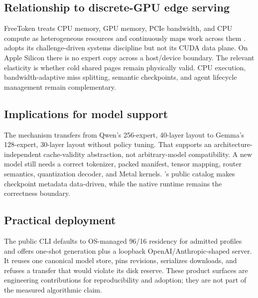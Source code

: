 \subsection{Relationship to discrete-GPU edge serving}

FreeToken treats CPU memory, GPU memory, PCIe bandwidth, and CPU compute as
heterogeneous resources and continuously maps work across them
\cite{yang2026freetoken}. \system adopts its challenge-driven systems
discipline but not its CUDA data plane. On Apple Silicon there is no expert copy
across a host/device boundary. The relevant elasticity is whether cold shared
pages remain physically valid. CPU execution, bandwidth-adaptive miss splitting,
semantic checkpoints, and agent lifecycle management remain complementary.

\subsection{Implications for model support}

The mechanism transfers from Qwen's 256-expert, 40-layer layout to Gemma's
128-expert, 30-layer layout without policy tuning. That supports an
architecture-independent cache-validity abstraction, not arbitrary-model
compatibility. A new model still needs a correct tokenizer, packed manifest,
tensor mapping, router semantics, quantization decoder, and Metal kernels.
\system's public catalog makes checkpoint metadata data-driven, while the
native runtime remains the correctness boundary.

\subsection{Practical deployment}

The public CLI defaults to OS-managed 96/16 residency for admitted profiles and
offers one-shot generation plus a loopback OpenAI/Anthropic-shaped server. It
reuses one canonical model store, pins revisions, serializes downloads, and
refuses a transfer that would violate its disk reserve. These product surfaces
are engineering contributions for reproducibility and adoption; they are not
part of the measured algorithmic claim.
